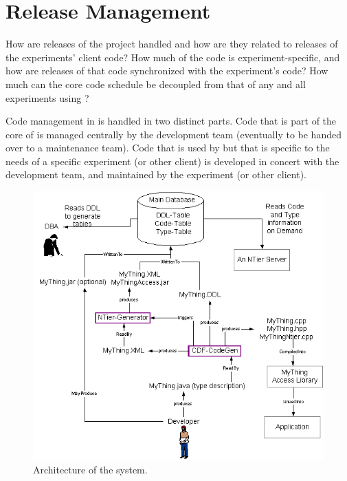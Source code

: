 \section{Release Management}

\begin{fixme}
How are releases of the \frontier project handled and how are they
related to releases of the experiments' client code? How much of the
\frontier code is experiment-specific, and how are releases of that
code synchronized with the experiment's code? How much can the
\frontier core code schedule be decoupled from that of any and all
experiments using \frontier?
\end{fixme}

Code management in \frontier is handled in two distinct parts. Code
that is part of the core of \frontier is managed centrally by the
\frontier development team (eventually to be handed over to a
\frontier maintenance team). Code that is used by \frontier but that
is specific to the needs of a specific experiment (or other client) is
developed in concert with the \frontier development team, and
maintained by the experiment (or other client).

\begin{figure}[hbt]
\includegraphics[width=\textwidth]{adding_defs.png}
\caption{Architecture of the \frontier system.
\label{fig:development}}
\end{figure}

